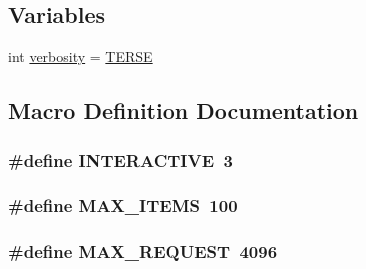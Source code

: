 \subsection*{Variables}
\begin{DoxyCompactItemize}
\item 
int \hyperlink{malloc-test_8c_a1bdcfae3209cbd96db35a2ae356fa15e}{verbosity} = \hyperlink{malloc-test_8c_ae70000f46dd84121830128e1701090ee}{T\+E\+R\+S\+E}
\end{DoxyCompactItemize}


\subsection{Macro Definition Documentation}
\hypertarget{malloc-test_8c_aa68dfac40a260bde9272c46bdf82613a}{}
\subsubsection[{I\+N\+T\+E\+R\+A\+C\+T\+I\+V\+E}]{\setlength{\rightskip}{0pt plus 5cm}\#define I\+N\+T\+E\+R\+A\+C\+T\+I\+V\+E~3}\label{malloc-test_8c_aa68dfac40a260bde9272c46bdf82613a}
\hypertarget{malloc-test_8c_a1b40ceb455086d9cdb68ed3d3bf2775f}{}
\subsubsection[{M\+A\+X\+\_\+\+I\+T\+E\+M\+S}]{\setlength{\rightskip}{0pt plus 5cm}\#define M\+A\+X\+\_\+\+I\+T\+E\+M\+S~100}\label{malloc-test_8c_a1b40ceb455086d9cdb68ed3d3bf2775f}
\hypertarget{malloc-test_8c_a79dc55ceff5acfd97aabd01db632a266}{}
\subsubsection[{M\+A\+X\+\_\+\+R\+E\+Q\+U\+E\+S\+T}]{\setlength{\rightskip}{0pt plus 5cm}\#define M\+A\+X\+\_\+\+R\+E\+Q\+U\+E\+S\+T~4096}\label{malloc-test_8c_a79dc55ceff5acfd97aabd01db632a266}
\hypertarget{malloc-test_8c_a404d5107b2cc06d2e236b7320df1fa7d}{}
